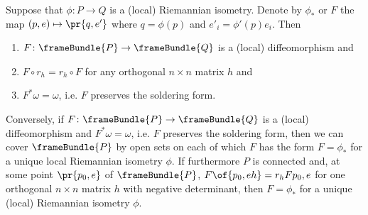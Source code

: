 \begin{lemma}
Suppose that \(\phi \colon P \to Q\) is a (local) Riemannian isometry.
Denote by \(\phi_*\) or \(F\) the map \((p,e) \mapsto \pr{q,e'}\) where \(q=\phi(p)\) and \(e'_i = \phi'(p)e_i\).
Then 
\begin{enumerate}
\item
\(F \colon \frameBundle{P} \to \frameBundle{Q}\) is a (local) diffeomorphism and
\item
\(F \circ r_h = r_h \circ F\) for any orthogonal \(n \times n\) matrix \(h\) and
\item
\(F^* \omega=\omega\), i.e. \(F\) preserves the soldering form.
\end{enumerate}

Conversely, if \(F \colon \frameBundle{P} \to \frameBundle{Q}\) is a (local) diffeomorphism and \(F^* \omega=\omega\), i.e. \(F\) preserves the soldering form, then we can cover \(\frameBundle{P}\) by open sets on each of which \(F\) has the form \(F=\phi_*\) for a unique local Riemannian isometry \(\phi\). 
If furthermore \(P\) is connected and, at some point \(\pr{p_0,e}\) of \(\frameBundle{P}\), \(F\of{p_0,eh} = r_h F{p_0,e}\) for one orthogonal \(n \times n\) matrix \(h\) with negative determinant, then \(F=\phi_*\) for a unique (local) Riemannian isometry \(\phi\). 
\end{lemma}
